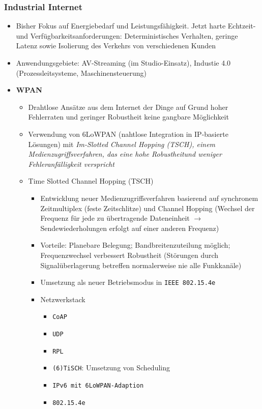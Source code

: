 \subsubsection{Industrial Internet}
\begin{itemize}
	\item Bisher Fokus auf Energiebedarf und Leistungsfähigkeit. Jetzt harte Echtzeit- und Verfügbarkeitsanforderungen: Deterministisches Verhalten, geringe Latenz sowie Isolierung des Verkehrs von verschiedenen Kunden
	\item Anwendungsgebiete: AV-Streaming (im Studio-Einsatz), Industie 4.0 (Prozessleitsysteme, Maschinensteuerung)
	\item \textbf{WPAN}
	\begin{itemize}
		\item Drahtlose Ansätze aus dem Internet der Dinge auf Grund hoher Fehlerraten und geringer Robustheit keine gangbare Möglichkeit
		\item Verwendung von 6LoWPAN (nahtlose Integration in IP-basierte Lösungen) mit \textit{Im-Slotted Channel Hopping (TSCH), einem Medienzugriffsverfahren, das eine hohe Robustheitund weniger Fehleranfälligkeit verspricht}
		\item Time Slotted Channel Hopping (TSCH)
		\begin{itemize}
			\item Entwicklung neuer Medienzugriffsverfahren basierend auf synchronem Zeitmultiplex (feste Zeitschlitze) und Channel Hopping (Wechsel der Frequenz für jede zu übertragende Dateneinheit \(\rightarrow\) Sendewiederholungen erfolgt auf einer anderen Frequenz)
			\item Vorteile: Planebare Belegung; Bandbreitenzuteilung möglich; Frequenzwechsel verbessert Robustheit (Störungen durch Signalüberlagerung betreffen normalerweise nie alle Funkkanäle)
			\item Umsetzung als neuer Betriebsmodus in \texttt{IEEE 802.15.4e}
			\item Netzwerkstack
			\begin{itemize}
				\item \texttt{CoAP}
				\item \texttt{UDP}
				\item \texttt{RPL}
				\item \texttt{(6)TiSCH}: Umsetzung von Scheduling
				\item \texttt{IPv6 mit 6LoWPAN-Adaption}
				\item \texttt{802.15.4e}
			\end{itemize}

\end{itemize}
\end{itemize}
\end{itemize}

